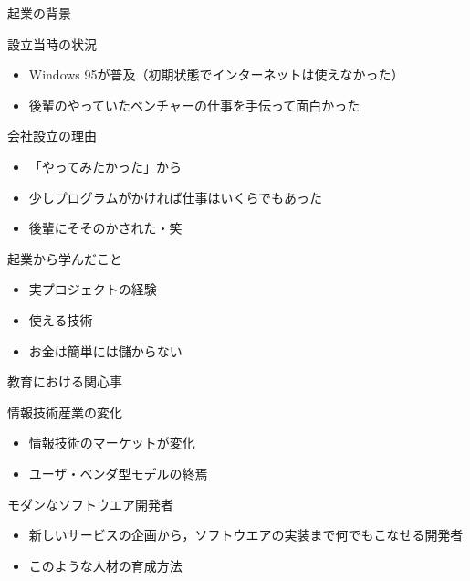 \documentclass[t]{beamer}
\begin{document}
\begin{frame}[label=sec-1-6]{起業の背景}
\begin{block}{設立当時の状況}
\begin{itemize}
\item Windows 95が普及（初期状態でインターネットは使えなかった）
\item 後輩のやっていたベンチャーの仕事を手伝って面白かった
\end{itemize}
\end{block}

\begin{block}{会社設立の理由}
\begin{itemize}
\item 「やってみたかった」から
\item 少しプログラムがかければ仕事はいくらでもあった
\item 後輩にそそのかされた・笑
\end{itemize}
\end{block}
\end{frame}

\begin{frame}[label=sec-1-7]{起業から学んだこと}
\begin{itemize}
\item 実プロジェクトの経験
\item 使える技術
\item お金は簡単には儲からない
\end{itemize}
\end{frame}

\begin{frame}[label=sec-1-8]{教育における関心事}
\begin{block}{情報技術産業の変化}
\begin{itemize}
\item 情報技術のマーケットが変化
\item ユーザ・ベンダ型モデルの終焉
\end{itemize}
\end{block}

\begin{block}{モダンなソフトウエア開発者}
\begin{itemize}
\item 新しいサービスの企画から，ソフトウエアの実装まで何でもこなせる開発者
\item このような人材の育成方法
\end{itemize}
\end{block}
\end{frame}
\end{document}
